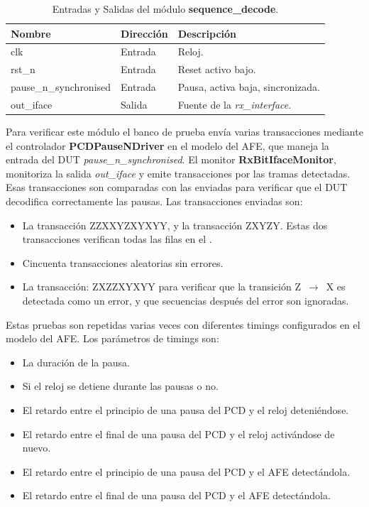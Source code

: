 \documentclass[a4paper, twoside, 11pt]{report}
\begin{document}
\begin{table}[htb]
  \centering
  \tablezebra
  \begin{tabulary}{\linewidth}{l|l|L}
    \textbf{Nombre}&\textbf{Dirección}&\textbf{Descripción} \\
    \hline
    clk&Entrada&Reloj. \\
    rst\_n&Entrada&Reset activo bajo. \\
    pause\_n\_synchronised &Entrada&Pausa, activa baja, sincronizada.\\
    out\_iface&Salida&Fuente de la \textit{rx\_interface}.\\
  \end{tabulary}
  \caption{Entradas y Salidas del módulo \textbf{sequence\_decode}.}
  \label{tab:ports_sequence_decode}
\end{table}

Para verificar este módulo el banco de prueba envía varias transacciones mediante el controlador \textbf{PCDPauseNDriver} en el modelo del AFE, que maneja la entrada del DUT \textit{pause\_n\_synchronised}. El monitor \textbf{RxBitIfaceMonitor}, monitoriza la salida \textit{out\_iface} y emite transacciones por las tramas detectadas. Esas transacciones son comparadas con las enviadas para verificar que el DUT decodifica correctamente las pausas. Las transacciones enviadas son:

\begin{itemize}
  \item La transacción ZZXXYZXYXYY, y la transacción ZXYZY. Estas dos transacciones verifican todas las filas en el .
  \item Cincuenta transacciones aleatorias sin errores.
  \item La transacción: ZXZZXYXYY para verificar que la transición Z~$\rightarrow$~X es detectada como un error, y que secuencias después del error son ignoradas.
\end{itemize}

Estas pruebas son repetidas varias veces con diferentes timings configurados en el modelo del AFE. Los parámetros de timings son:

\begin{itemize}
  \item La duración de la pausa.
  \item Si el reloj se detiene durante las pausas o no.
  \item El retardo entre el principio de una pausa del PCD y el reloj deteniéndose.
  \item El retardo entre el final de una pausa del PCD y el reloj activándose de nuevo.
  \item El retardo entre el principio de una pausa del PCD y el AFE detectándola.
  \item El retardo entre el final de una pausa del PCD y el AFE detectándola.
\end{itemize}
\end{document}
